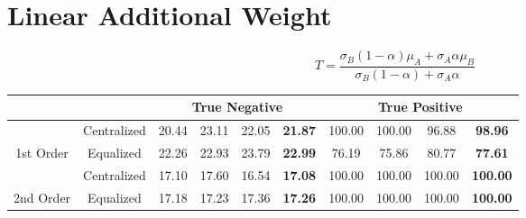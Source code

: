 \documentclass[10pt,a4paper]{article}
\begin{document}
	\section{Linear Additional Weight}
		$$T = \frac{\sigma_B (1 - \alpha) \mu_A + \sigma_A \alpha \mu_B}{\sigma_B (1 - \alpha) + \sigma_A \alpha}$$
		\begin{table}[!h]
			\centering
			\begin{tabular}{|c|c|c|c|c|c|c|c|c|c|}
				\hline
				&             & \multicolumn{4}{c|}{True Negative}                            & \multicolumn{4}{c|}{True Positive}                                \\ \hline
				& Centralized & 20.44 & 23.11 & 22.05 & {\color[HTML]{FE0000} \textbf{21.87}} & 100.00 & 100.00 & 96.88  & {\color[HTML]{FE0000} \textbf{98.96}}  \\ \cline{2-10} 
				\multirow{-2}{*}{1st Order} & Equalized   & 22.26 & 22.93 & 23.79 & {\color[HTML]{FE0000} \textbf{22.99}} & 76.19  & 75.86  & 80.77  & {\color[HTML]{FE0000} \textbf{77.61}}  \\ \hline
				& Centralized & 17.10 & 17.60 & 16.54 & {\color[HTML]{FE0000} \textbf{17.08}} & 100.00 & 100.00 & 100.00 & {\color[HTML]{FE0000} \textbf{100.00}} \\ \cline{2-10} 
				\multirow{-2}{*}{2nd Order} & Equalized   & 17.18 & 17.23 & 17.36 & {\color[HTML]{FE0000} \textbf{17.26}} & 100.00 & 100.00 & 100.00 & {\color[HTML]{FE0000} \textbf{100.00}} \\ \hline
			\end{tabular}
		\end{table}
	
\end{document}
